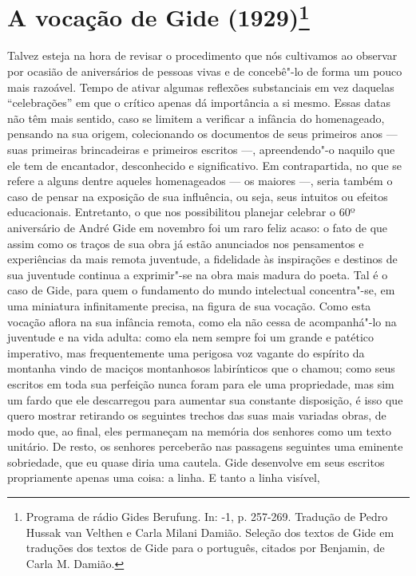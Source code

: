 \chapter{A vocação de Gide (1929)\footnote[*]{Programa
  de rádio Gides Berufung. In: -1, p. 257-269. Tradução de Pedro
  Hussak van Velthen e Carla Milani Damião. Seleção dos textos de Gide
  em traduções dos textos de Gide para o português, citados por
  Benjamin, de Carla M. Damião.}}

Talvez esteja na hora de revisar o procedimento que nós cultivamos ao
observar por ocasião de aniversários de pessoas vivas e de concebê"-lo de
forma um pouco mais razoável. Tempo de ativar algumas reflexões
substanciais em vez daquelas ``celebrações'' em que o crítico apenas
dá importância a si mesmo. Essas datas não têm mais sentido, caso se limitem a verificar a infância do homenageado, pensando na sua origem, colecionando os documentos de seus primeiros anos --- suas primeiras brincadeiras e primeiros escritos ---, apreendendo"-o naquilo que ele tem de encantador, desconhecido e significativo. Em
contrapartida, no que se refere a alguns dentre aqueles homenageados --- os maiores ---,
seria também o caso de pensar na exposição de sua influência, ou seja, seus intuitos ou
efeitos educacionais. Entretanto, o que nos possibilitou planejar celebrar o 60º aniversário de André Gide em novembro foi um raro feliz acaso: o fato de que assim como os traços de sua
obra já estão anunciados nos pensamentos e experiências da mais remota
juventude, a fidelidade às inspirações e destinos de sua
juventude continua a exprimir"-se na obra mais madura do poeta.
Tal é o caso de Gide, para quem o
fundamento do mundo intelectual concentra"-se,
em uma miniatura infinitamente precisa, na figura de sua vocação. Como esta
vocação aflora na sua infância remota, como ela não cessa de
acompanhá"-lo na juventude e na vida adulta: como ela nem sempre foi um grande e
patético imperativo, mas frequentemente uma perigosa voz vagante do
espírito da montanha vindo de maciços montanhosos
labirínticos que o chamou; como seus escritos em toda sua perfeição nunca foram para
ele uma propriedade, mas sim um fardo que ele descarregou para aumentar
sua constante disposição, é isso que quero mostrar retirando os seguintes trechos das
suas mais variadas obras, de modo que, ao final,
eles permaneçam na memória dos senhores como um texto unitário. De
resto, os senhores perceberão nas passagens seguintes uma eminente
sobriedade, que eu quase diria uma cautela. Gide desenvolve em seus escritos
propriamente apenas uma coisa: a linha. E tanto a linha visível,
